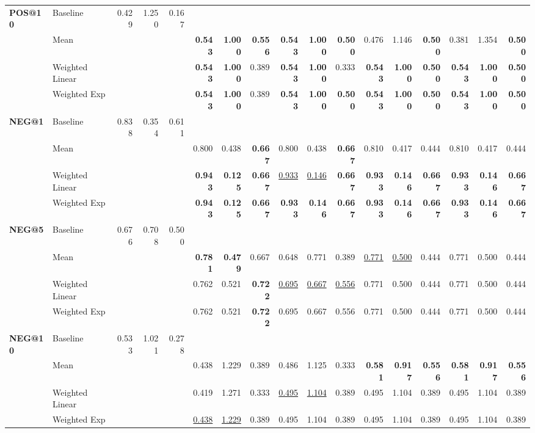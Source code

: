 \documentclass{article}
\begin{document}
\begin{table}[htbp]
\begin{tabular}{@{}llrrr|rrr|rrr|rrr|rrr@{}}
\multirow{4}{*}{\textbf{POS@10}} 
& Baseline & 0.429 & 1.250 & 0.167 & & & & & & & & & & & & \\
& Mean & & & & \textbf{0.543} & \textbf{1.000} & \textbf{0.556} & \textbf{0.543} & \textbf{1.000} & \textbf{0.500} & 0.476 & 1.146 & \textbf{0.500} & 0.381 & 1.354 & \textbf{0.500} \\
& Weighted Linear & & & & \textbf{0.543} & \textbf{1.000} & 0.389 & \textbf{0.543} & \textbf{1.000} & 0.333 & \textbf{0.543} & \textbf{1.000} & \textbf{0.500} & \textbf{0.543} & \textbf{1.000} & \textbf{0.500} \\
& Weighted Exp & & & & \textbf{0.543} & \textbf{1.000} & 0.389 & \textbf{0.543} & \textbf{1.000} & \textbf{0.500} & \textbf{0.543} & \textbf{1.000} & \textbf{0.500} & \textbf{0.543} & \textbf{1.000} & \textbf{0.500} \\
\midrule

\multirow{4}{*}{\textbf{NEG@1}} 
& Baseline & 0.838 & 0.354 & 0.611 & & & & & & & & & & & & \\
& Mean & & & & 0.800 & 0.438 & \textbf{0.667} & 0.800 & 0.438 & \textbf{0.667} & 0.810 & 0.417 & 0.444 & 0.810 & 0.417 & 0.444 \\
& Weighted Linear & & & & \textbf{0.943} & \textbf{0.125} & \textbf{0.667} & \uline{0.933} & \uline{0.146} & \textbf{0.667} & \textbf{0.933} & \textbf{0.146} & \textbf{0.667} & \textbf{0.933} & \textbf{0.146} & \textbf{0.667} \\
& Weighted Exp & & & & \textbf{0.943} & \textbf{0.125} & \textbf{0.667} & \textbf{0.933} & \textbf{0.146} & \textbf{0.667} & \textbf{0.933} & \textbf{0.146} & \textbf{0.667} & \textbf{0.933} & \textbf{0.146} & \textbf{0.667} \\
\midrule

\multirow{4}{*}{\textbf{NEG@5}} 
& Baseline & 0.676 & 0.708 & 0.500 & & & & & & & & & & & & \\
& Mean & & & & \textbf{0.781} & \textbf{0.479} & 0.667 & 0.648 & 0.771 & 0.389 & \uline{0.771} & \uline{0.500} & 0.444 & 0.771 & 0.500 & 0.444 \\
& Weighted Linear & & & & 0.762 & 0.521 & \textbf{0.722} & \uline{0.695} & \uline{0.667} & \uline{0.556} & 0.771 & 0.500 & 0.444 & 0.771 & 0.500 & 0.444 \\
& Weighted Exp & & & & 0.762 & 0.521 & \textbf{0.722} & 0.695 & 0.667 & 0.556 & 0.771 & 0.500 & 0.444 & 0.771 & 0.500 & 0.444 \\
\midrule

\multirow{4}{*}{\textbf{NEG@10}} 
& Baseline & 0.533 & 1.021 & 0.278 & & & & & & & & & & & & \\
& Mean & & & & 0.438 & 1.229 & 0.389 & 0.486 & 1.125 & 0.333 & \textbf{0.581} & \textbf{0.917} & \textbf{0.556} & \textbf{0.581} & \textbf{0.917} & \textbf{0.556} \\
& Weighted Linear & & & & 0.419 & 1.271 & 0.333 & \uline{0.495} & \uline{1.104} & 0.389 & 0.495 & 1.104 & 0.389 & 0.495 & 1.104 & 0.389 \\
& Weighted Exp & & & & \uline{0.438} & \uline{1.229} & 0.389 & 0.495 & 1.104 & 0.389 & 0.495 & 1.104 & 0.389 & 0.495 & 1.104 & 0.389 \\
\midrule


\end{tabular}
\end{table}
\end{document}
